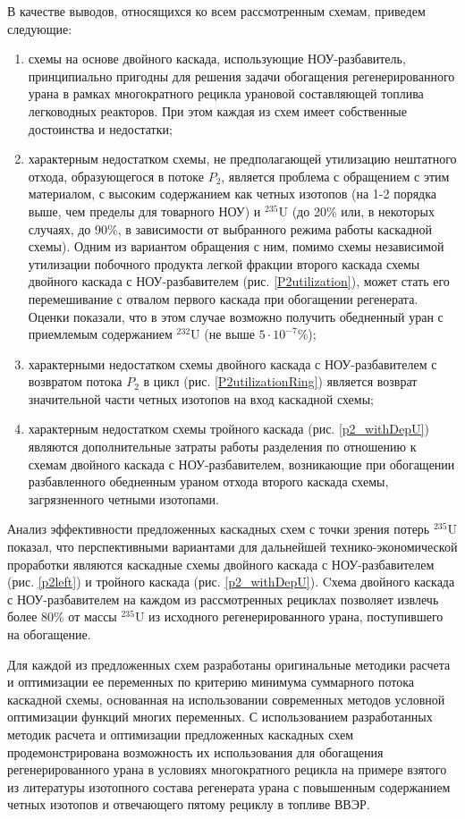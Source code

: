 В качестве выводов, относящихся ко всем рассмотренным схемам, приведем следующие:
\begin{enumerate}
    \item схемы на основе двойного каскада, использующие НОУ-разбавитель, принципиально пригодны для решения задачи обогащения регенерированного урана в рамках многократного рецикла урановой составляющей топлива легководных реакторов. При этом каждая из схем имеет собственные достоинства и недостатки;
    \item характерным недостатком схемы, не предполагающей утилизацию нештатного отхода, образующегося в потоке $P_2$, является проблема с обращением с этим материалом, с высоким содержанием как четных изотопов (на 1-2 порядка выше, чем пределы для товарного НОУ) и $^{235}$U (до 20\% или, в некоторых случаях, до 90\%, в зависимости от выбранного режима работы каскадной схемы). Одним из вариантом обращения с ним, помимо схемы независимой утилизации побочного продукта легкой фракции второго каскада схемы двойного каскада с НОУ-разбавителем (рис. \ref{P2utilization}), может стать его перемешивание с отвалом первого каскада при обогащении регенерата. Оценки показали, что в этом случае возможно получить обедненный уран с приемлемым содержанием $^{232}$U (не выше $5\cdot10^{-7}$\%);
    \item характерными недостатком схемы двойного каскада с НОУ-разбавителем с возвратом потока $P_2$ в цикл (рис. \ref{P2utilizationRing}) является возврат значительной части четных изотопов на вход каскадной схемы;
    \item характерным недостатком схемы тройного каскада (рис. \ref{p2_withDepU}) являются дополнительные затраты работы разделения по отношению к схемам двойного каскада с НОУ-разбавителем, возникающие при обогащении разбавленного обедненным ураном отхода второго каскада схемы, загрязненного четными изотопами.
  \end{enumerate}

Анализ эффективности предложенных каскадных схем с точки зрения потерь $^{235}$U показал, что перспективными вариантами для дальнейшей технико-экономической проработки являются каскадные схемы двойного каскада с НОУ-разбавителем (рис. \ref{p2left}) и тройного каскада (рис. \ref{p2_withDepU}). Cхема двойного каскада с НОУ-разбавителем на каждом из рассмотренных рециклах позволяет извлечь более 80\% от массы $^{235}$U из исходного регенерированного урана, поступившего на обогащение.

Для каждой из предложенных схем разработаны оригинальные методики расчета и оптимизации ее переменных по критерию минимума суммарного потока каскадной схемы, основанная на использовании современных методов условной оптимизации функций многих переменных. С использованием разработанных методик расчета и оптимизации предложенных каскадных схем продемонстрирована возможность их использования для обогащения регенерированного урана в условиях многократного рецикла на примере взятого из литературы изотопного состава регенерата урана с повышенным содержанием четных изотопов и отвечающего пятому рециклу в топливе ВВЭР.

